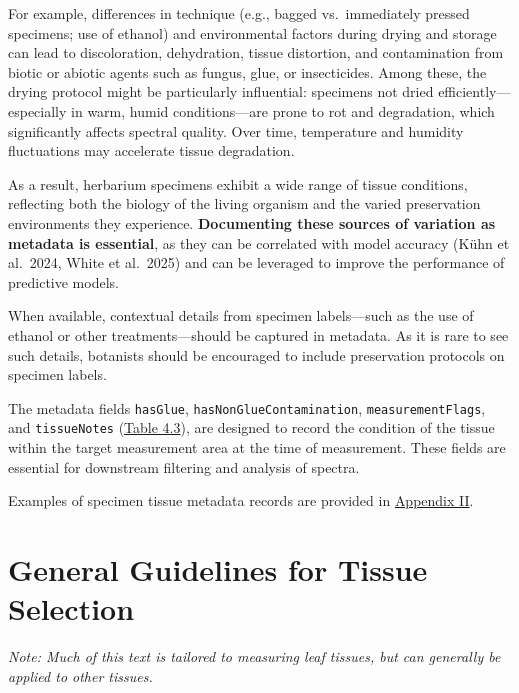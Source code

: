 \documentclass[
  letterpaper,
  DIV=11,
  numbers=noendperiod]{scrreprt}
\begin{document}
For example, differences in technique (e.g., bagged vs.~immediately
pressed specimens; use of ethanol) and environmental factors during
drying and storage can lead to discoloration, dehydration, tissue
distortion, and contamination from biotic or abiotic agents such as
fungus, glue, or insecticides. Among these, the drying protocol might be
particularly influential: specimens not dried efficiently---especially
in warm, humid conditions---are prone to rot and degradation, which
significantly affects spectral quality. Over time, temperature and
humidity fluctuations may accelerate tissue degradation.

As a result, herbarium specimens exhibit a wide range of tissue
conditions, reflecting both the biology of the living organism and the
varied preservation environments they experience. \textbf{Documenting
these sources of variation as metadata is essential}, as they can be
correlated with model accuracy (Kühn et al.~2024, White et al.~2025) and
can be leveraged to improve the performance of predictive models.

When available, contextual details from specimen labels---such as the
use of ethanol or other treatments---should be captured in metadata. As
it is rare to see such details, botanists should be encouraged to
include preservation protocols on specimen labels.

The metadata fields \texttt{hasGlue}, \texttt{hasNonGlueContamination},
\texttt{measurementFlags}, and \texttt{tissueNotes}
(\hyperref[tbl-4-3]{Table 4.3}), are designed to record the condition of
the tissue within the target measurement area at the time of
measurement. These fields are essential for downstream filtering and
analysis of spectra.

Examples of specimen tissue metadata records are provided in
\href{appendix2.qmd}{Appendix II}.

\section{General Guidelines for Tissue
Selection}\label{general-guidelines-for-tissue-selection}

\emph{Note: Much of this text is tailored to measuring leaf tissues, but
can generally be applied to other tissues.}
\end{document}
